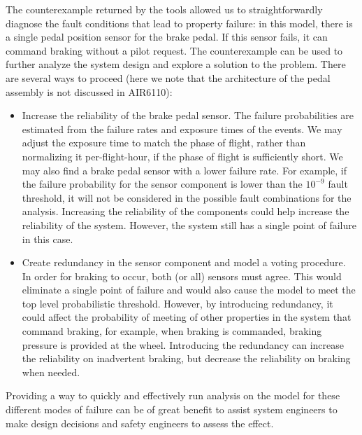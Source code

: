 The counterexample returned by the tools allowed us to straightforwardly diagnose the fault conditions that lead to property failure: in this model, there is a single pedal position sensor for the brake pedal. If this sensor fails, it can command braking without a pilot request. The counterexample can be used to further analyze the system design and explore a solution to the problem. There are several ways to proceed (here we note that the architecture of the pedal assembly is not discussed in AIR6110):
	\begin{itemize}
	\renewcommand{\labelitemi}{\textbullet}
	\item Increase the reliability of the brake pedal sensor. The failure probabilities are estimated from the failure rates and exposure times of the events. We may adjust the exposure time to match the phase of flight, rather than normalizing it per-flight-hour, if the phase of flight is sufficiently short. We may also find a brake pedal sensor with a lower failure rate. For example, if the failure probability for the sensor component is lower than the $10^{-9}$ fault threshold, it will not be considered in the possible fault combinations for the analysis. Increasing the reliability of the components could help increase the reliability of the system. However, the system still has a single point of failure in this case.
	
	\item Create redundancy in the sensor component and model a voting procedure.
	In order for braking to occur, both (or all) sensors must agree. This would eliminate a single point of failure and would also cause the model to meet the top level probabilistic threshold. However, by introducing redundancy, it could affect the probability of meeting of other properties in the system that command braking, for example, when braking is commanded, braking pressure is provided at the wheel. Introducing the redundancy can increase the reliability on inadvertent braking, but decrease the reliability on braking when needed.
\end{itemize}

Providing a way to quickly and effectively run analysis on the model %
for these different modes of failure can be of great benefit to assist system engineers to make design decisions and safety engineers to assess the effect.

